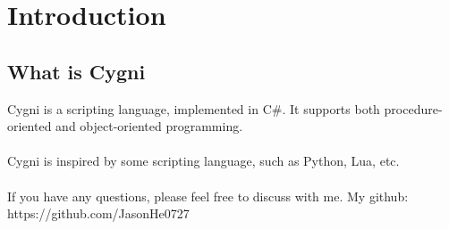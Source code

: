 \chapter{Introduction}
\section{What is Cygni}
Cygni is a scripting language, implemented in C\#. It supports both procedure-oriented and object-oriented programming. \\\\
Cygni is inspired by some scripting language, such as Python, Lua, etc. \\\\
If you have any questions, please feel free to discuss with me. My github: https://github.com/JasonHe0727


